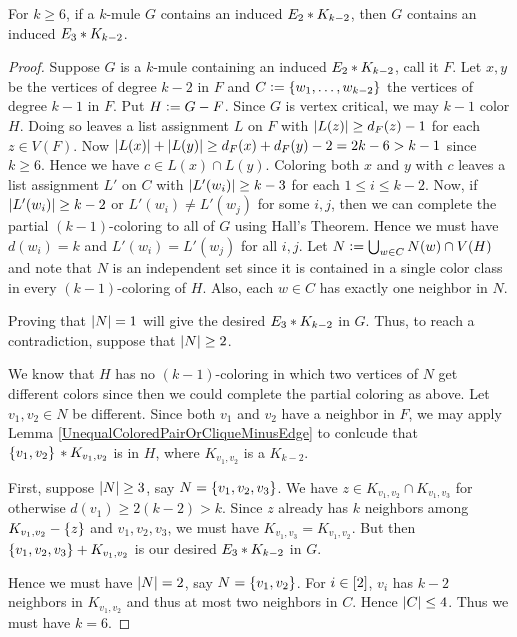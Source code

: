 \begin{lem}\label{E2impliesE3}
For $k \geq 6$, if a $k$-mule $G$ contains an induced $E_2 \mbox{\hspace{2 pt}$\ast$\hspace{2 pt}} K_{k - 2}$, then $G$ contains an induced $E_3 \mbox{\hspace{2 pt}$\ast$\hspace{2 pt}} K_{k - 2}$.
\end{lem}
\begin{proof}
Suppose $G$ is a $k$-mule containing an induced $E_2 \mbox{\hspace{2 pt}$\ast$\hspace{2 pt}} K_{k - 2}$, call it $F$.  
Let $x, y$ be the vertices of degree $k-2$ in $F$ and $C \mathrel{\mathop:}= \left\{ w_1,
\ldots, w_{k-2} \right\}$ the vertices of degree $k-1$ in $F$.  Put $H \mathrel{\mathop:}= G -
F$. Since $G$ is vertex critical, we may $k-1$ color $H$.  Doing so leaves a list assignment $L$ on $F$ with $\left|L(z)\right| \geq d_F(z) - 1$ for each $z \in V(F)$. 
Now $\left|L(x)\right| + \left|L(y)\right| \geq d_F(x) + d_F(y) - 2 = 2k - 6 > k - 1$ since $k \geq 6$.  Hence we have $c \in L(x) \cap L(y)$.  
Coloring both $x$ and $y$ with $c$ leaves a list assignment $L'$ on $C$ with $\left|L'(w_i)\right| \geq k - 3$ for each $1 \leq i \leq k-2$.  
Now, if $\left|L'(w_i)\right| \geq k - 2$ or $L'(w_i) \neq L'(w_j)$ for some $i, j$, then we can complete the partial $(k - 1)$-coloring to all of $G$ using Hall's Theorem.  
Hence we must have $d(w_i) = k$ and $L'(w_i) = L'(w_j)$ for all $i,j$.  
Let $N \mathrel{\mathop:}= \bigcup_{w \in C} N(w) \cap V(H)$ and note that $N$ is an
independent set since it is contained in a single color class in every $(k - 1)$-coloring of $H$. Also, each $w \in C$ has exactly one neighbor in $N$.

Proving that $\left|N\right| = 1$ will give the desired $E_3 \mbox{\hspace{2 pt}$\ast$\hspace{2 pt}} K_{k - 2}$ in $G$.  Thus, to reach a contradiction, suppose that $\left|N\right| \geq 2$.  

We know that $H$ has no $(k - 1)$-coloring in which two vertices of $N$ get different colors since then we could complete the partial coloring as above. 
Let $v_1, v_2 \in N$ be different. Since both $v_1$ and $v_2$ have a neighbor in $F$, we may apply Lemma \ref{UnequalColoredPairOrCliqueMinusEdge} to conlcude 
that $\left\{ v_1, v_2 \right\} \mbox{\hspace{2 pt}$\ast$\hspace{2 pt}} K_{v_1, v_2}$ is in $H$, where $K_{v_1, v_2}$ is a $K_{k-2}$.

First, suppose $\left|N\right| \geq 3$, say $N = \left\{ v_1, v_2, v_3 \right\}$.  We have $z \in K_{v_1, v_2} \cap K_{v_1, v_3}$ for otherwise $d(v_1) \geq 2(k - 2) > k$.  
Since $z$ already has $k$ neighbors among $K_{v_1, v_2} - \left\{ z \right\}$ and $v_1, v_2, v_3$, we must have $K_{v_1, v_3} = K_{v_1, v_2}$.  
But then $\left\{ v_1, v_2, v_3 \right\} + K_{v_1, v_2}$ is our desired $E_3 \mbox{\hspace{2 pt}$\ast$\hspace{2 pt}} K_{k - 2}$ in $G$.

Hence we must have $\left|N\right| = 2$, say $N = \left\{ v_1, v_2 \right\}$.  For $i \in \left[2\right]$, $v_i$ has $k - 2$ neighbors in $K_{v_1, v_2}$ and thus at most two neighbors in $C$.  
Hence $\left|C\right| \leq 4$.  Thus we must have $k = 6$.


\end{proof}
